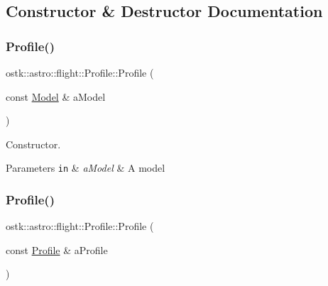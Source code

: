 \subsection{Constructor \& Destructor Documentation}
\mbox{\label{classostk_1_1astro_1_1flight_1_1_profile_a09d523b4a58db0d8cc082b4a4d1418a7}} 
\subsubsection{\texorpdfstring{Profile()}{Profile()}\hspace{0.1cm}{\footnotesize\ttfamily [1/2]}}
{\footnotesize\ttfamily ostk\+::astro\+::flight\+::\+Profile\+::\+Profile (\begin{DoxyParamCaption}\item[{const \hyperlink{classostk_1_1astro_1_1flight_1_1profile_1_1_model}{Model} \&}]{a\+Model }\end{DoxyParamCaption})}



Constructor. 


\begin{DoxyParams}[1]{Parameters}
\mbox{\tt in}  & {\em a\+Model} & A model \\
\hline
\end{DoxyParams}
\mbox{\label{classostk_1_1astro_1_1flight_1_1_profile_a67dc07f205bb3c49c5da9f2013f81f40}} 
\subsubsection{\texorpdfstring{Profile()}{Profile()}\hspace{0.1cm}{\footnotesize\ttfamily [2/2]}}
{\footnotesize\ttfamily ostk\+::astro\+::flight\+::\+Profile\+::\+Profile (\begin{DoxyParamCaption}\item[{const \hyperlink{classostk_1_1astro_1_1flight_1_1_profile}{Profile} \&}]{a\+Profile }\end{DoxyParamCaption})}



